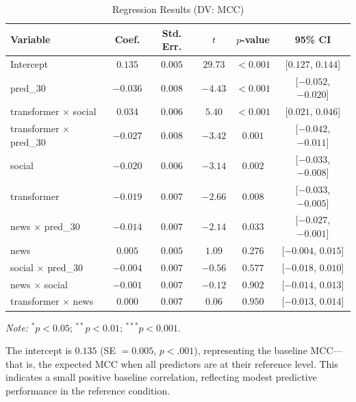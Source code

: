 \documentclass[stu,floatsintext]{apa7}
\begin{document}
\begin{table}[htbp]
\centering
\caption{Regression Results (DV: MCC)}
\label{tab:mcc_results}
\begin{tabular}{lccccc}
\toprule
Variable & Coef. & Std. Err. & $t$ & $p$-value & 95\% CI \\
\midrule
Intercept                  & $0.135$  & $0.005$ & $29.73$ & $<0.001$\rlap{$^{***}$} & [$0.127$, $0.144$] \\
pred\_30                   & $-0.036$ & $0.008$ & $-4.43$ & $<0.001$\rlap{$^{***}$} & [$-0.052$, $-0.020$] \\
transformer $\times$ social & $0.034$  & $0.006$ & $5.40$  & $<0.001$\rlap{$^{***}$} & [$0.021$, $0.046$] \\
transformer $\times$ pred\_30 & $-0.027$ & $0.008$ & $-3.42$ & $0.001$\rlap{$^{***}$} & [$-0.042$, $-0.011$] \\
social                     & $-0.020$ & $0.006$ & $-3.14$ & $0.002$\rlap{$^{**}$}  & [$-0.033$, $-0.008$] \\
transformer                & $-0.019$ & $0.007$ & $-2.66$ & $0.008$\rlap{$^{**}$}  & [$-0.033$, $-0.005$] \\
news $\times$ pred\_30     & $-0.014$ & $0.007$ & $-2.14$ & $0.033$\rlap{$^{*}$}   & [$-0.027$, $-0.001$] \\
news                       & $0.005$  & $0.005$ & $1.09$  & $0.276$                & [$-0.004$, $0.015$] \\
social $\times$ pred\_30   & $-0.004$ & $0.007$ & $-0.56$ & $0.577$                & [$-0.018$, $0.010$] \\
news $\times$ social       & $-0.001$ & $0.007$ & $-0.12$ & $0.902$                & [$-0.014$, $0.013$] \\
transformer $\times$ news  & $0.000$  & $0.007$ & $0.06$  & $0.950$                & [$-0.013$, $0.014$] \\
\bottomrule
\end{tabular}
\begin{flushleft}
\footnotesize
\textit{Note:} $^{*}p<0.05$; $^{**}p<0.01$; $^{***}p<0.001$.
\end{flushleft}
\end{table}

The intercept is $0.135$ (SE $= 0.005$, $p < .001$), representing the baseline MCC---that is, the expected MCC when all predictors are at their reference level. This indicates a small positive baseline correlation, reflecting modest predictive performance in the reference condition.
\end{document}
